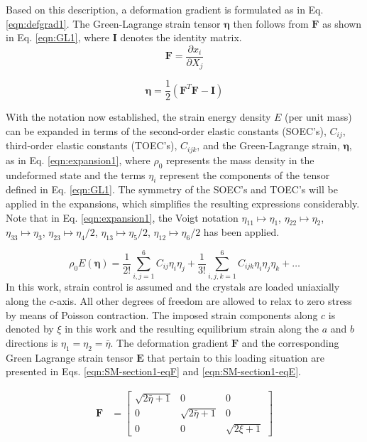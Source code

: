 \documentclass[showpacs,aps,floatfix,prb,reprint,superscriptaddress,onecolumn]{revtex4-1}
\begin{document}
Based on this description, a deformation gradient is formulated as in Eq. \ref{eqn:defgrad1}. The Green-Lagrange strain tensor $\bm{\eta}$ then follows from $\bm{F}$ as shown in Eq. \ref{eqn:GL1}, where $\bm{I}$ denotes the identity matrix.
\begin{equation}
\label{eqn:defgrad1} 
\bm{F} = \frac{\partial x_{i}}{ \partial X_{j}}
\end{equation}

\begin{equation}
\label{eqn:GL1} 
\bm{\eta} = \frac{1}{2} \left(\bm{F}^{T} \bm{F} - \bm{I} \right)
\end{equation}

With the notation now established, the strain energy density $E$ (per unit mass) can be expanded in terms of the second-order elastic constants (SOEC's), $C_{ij}$, third-order elastic constants (TOEC's), $C_{ijk}$, and the Green-Lagrange strain, $\bm{\eta}$,  as in Eq. \ref{eqn:expansion1}, where $\rho_{0}$ represents the mass density in the undeformed state and the terms $\eta_{i}$ represent the components of the tensor defined in Eq. \ref{eqn:GL1}. The symmetry of the SOEC's and TOEC's will be applied in the expansions, which simplifies the resulting expressions considerably. Note that in Eq. \ref{eqn:expansion1}, the Voigt notation $\eta_{11} \mapsto \eta_{1}$, $\eta_{22} \mapsto \eta_{2}$, $\eta_{33} \mapsto \eta_{3}$, $\eta_{23} \mapsto \eta_{4}/2$, $\eta_{13} \mapsto \eta_{5}/2$, $\eta_{12} \mapsto \eta_{6}/2$ has been applied.

\begin{equation}
\label{eqn:expansion1} 
\rho_{0} E \left(\bm{\eta}\right) = \frac{1}{2!} \sum_{i,j=1}^{6} C_{ij} \eta_{i} \eta_{j} + \frac{1}{3!} \sum_{i,j,k=1}^{6} C_{ijk} \eta_{i} \eta_{j} \eta_{k} + \ldots
\end{equation}
In this work, strain control is assumed and the crystals are loaded uniaxially along the $c$-axis. All other degrees of freedom are allowed to relax to zero stress by means of Poisson contraction. The imposed strain components along $c$ is denoted by $\xi$ in this work and the resulting equilibrium strain along the $a$ and $b$ directions is $\eta_{1} = \eta_{2} = \bar{\eta}$. The deformation gradient $\bm{F}$ and the corresponding Green Lagrange strain tensor $\bm{E}$ that pertain to this loading situation are presented in Eqs. \ref{eqn:SM-section1-eqF} and \ref{eqn:SM-section1-eqE}.  

\begin{equation}
\label{eqn:SM-section1-eqF}
  \begin{aligned}
        \bm{F}&=\begin{bmatrix} \sqrt{2\bar{\eta}+1} & 0 & 0 \\ 0 & \sqrt{2\bar{\eta}+1} & 0 \\ 0 & 0 & \sqrt{2\xi+1} \end{bmatrix}
       \end{aligned}
\end{equation} 
\end{document}
